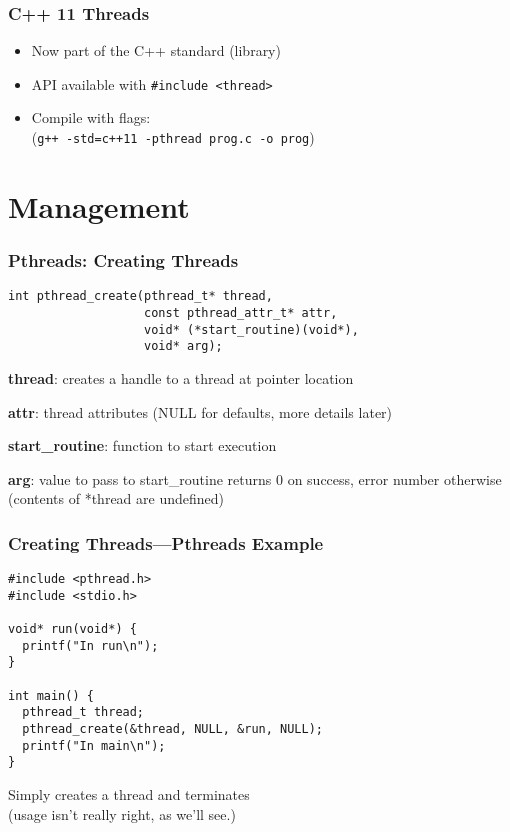\documentclass[aspectratio=43]{beamer}
\newenvironment{changemargin}[1]{%
  \begin{list}{}{%
    \setlength{\topsep}{0pt}%
    \setlength{\leftmargin}{#1}%
    \setlength{\rightmargin}{1em}
    \setlength{\listparindent}{\parindent}%
    \setlength{\itemindent}{\parindent}%
    \setlength{\parsep}{\parskip}%
  }%
  \item[]}{\end{list}}
\begin{document}
\begin{frame}[fragile]
  \frametitle{C++ 11 Threads}

  \begin{changemargin}{1.5cm}
  \begin{itemize}
    \item Now part of the C++ standard (library)
    \vfill
    \item API available with {\tt \#include <thread>}
    \vfill
    \item Compile with flags: \\ (\verb!g++ -std=c++11 -pthread prog.c -o prog!)
  \end{itemize}
  \end{changemargin}
\end{frame}

\section{Management}
\begin{frame}[fragile]
  \frametitle{Pthreads: Creating Threads}

  \begin{changemargin}{1.5cm}
  \begin{lstlisting}
int pthread_create(pthread_t* thread, 
                   const pthread_attr_t* attr,
                   void* (*start_routine)(void*),
                   void* arg);
  \end{lstlisting}
  \vfill
  {\bf thread}: creates a handle to a thread at pointer location

  {\bf attr}: thread attributes (NULL for defaults, more details later)

  {\bf start\_routine}: function to start execution

  {\bf arg}: value to pass to start\_routine
  \vfill
  returns 0 on success, error number otherwise\\(contents of *thread are
  undefined)
  \end{changemargin}
\end{frame}

\begin{frame}[fragile]
  \frametitle{Creating Threads---Pthreads Example}

  \begin{changemargin}{1.5cm}
\begin{lstlisting}
#include <pthread.h>
#include <stdio.h>

void* run(void*) {
  printf("In run\n");
}

int main() {
  pthread_t thread;
  pthread_create(&thread, NULL, &run, NULL);
  printf("In main\n");
}
\end{lstlisting}
  \vfill
  Simply creates a thread and terminates\\(usage isn't really right, as we'll
  see.)
  \end{changemargin}
\end{frame}
\end{document}
